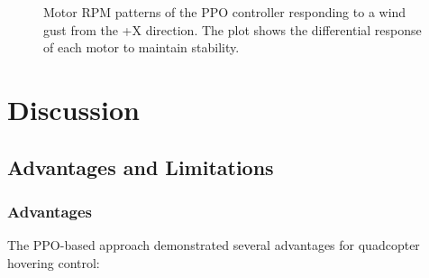 \documentclass[12pt]{article}
\begin{document}
%     
%     
%     

\begin{figure}[htbp]
\centering
\caption{Motor RPM patterns of the PPO controller responding to a wind gust from the +X direction. The plot shows the differential response of each motor to maintain stability.}
\label{fig:motor_rpm}
\end{figure}


\section{Discussion}
\subsection{Advantages and Limitations}

\subsubsection{Advantages}
The PPO-based approach demonstrated several advantages for quadcopter hovering control:

\end{document}
